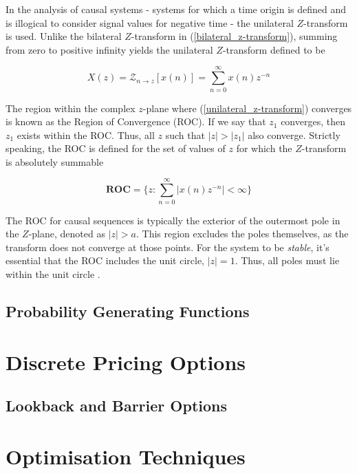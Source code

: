 \documentclass[a4paper]{report}
\begin{document}
In the analysis of causal systems - systems for which a time origin is defined and is illogical to consider signal values for negative time - the unilateral $Z$-transform is used. Unlike the bilateral $Z$-transform in (\ref{bilateral_z-transform}), summing from zero to positive infinity yields the unilateral $Z$-transform defined to be

\begin{equation}\label{unilateral_z-transform}
	X(z) = \mathcal{Z}_{n \rightarrow z}[x(n)] = \sum^{\infty}_{n = 0} x(n)z^{-n}
\end{equation}

The region within the complex $z$-plane where (\ref{unilateral_z-transform}) converges is known as the Region of Convergence (ROC). If we say that $z_1$ converges, then $z_1$ exists within the ROC. Thus, all $z$ such that $|z| > |z_1|$ also converge. Strictly speaking, the ROC is defined for the set of values of $z$ for which the $Z$-transform is absolutely summable

\begin{equation}\label{roc}
	\textbf{ROC} = \Biggl\{ z : \sum^{\infty}_{n = 0} |x(n)z^{-n}| < \infty \Biggr\}
\end{equation}

The ROC for causal sequences is typically the exterior of the outermost pole in the $Z$-plane, denoted as $|z| > a$. This region excludes the poles themselves, as the transform does not converge at those points. For the system to be \textit{stable}, it's essential that the ROC includes the unit circle, $|z| = 1$. Thus, all poles must lie within the unit circle \cite{LovelessGuido2021}.

\subsection{Probability Generating Functions}


\section{Discrete Pricing Options}

\subsection{Lookback and Barrier Options}

\section{Optimisation Techniques}
\end{document}

